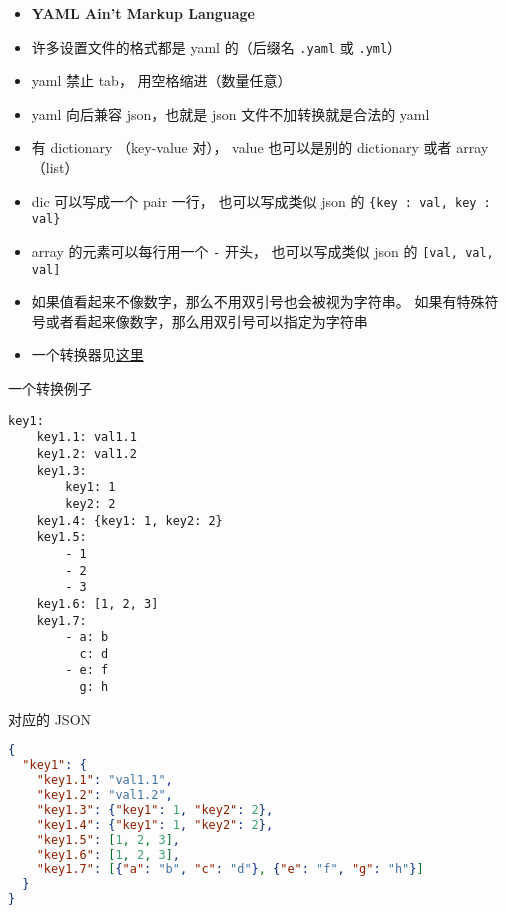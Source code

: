 
\begin{issues}
\issueDraft
\end{issues}


\begin{itemize}
\item \textbf{YAML Ain't Markup Language}
\item 许多设置文件的格式都是 yaml 的（后缀名 \verb`.yaml` 或 \verb`.yml`）
\item yaml 禁止 tab， 用空格缩进（数量任意）
\item yaml 向后兼容 json，也就是 json 文件不加转换就是合法的 yaml
\item 有 dictionary （key-value 对）， value 也可以是别的 dictionary 或者 array （list）
\item dic 可以写成一个 pair 一行， 也可以写成类似 json 的 \verb`{key : val, key : val}`
\item array 的元素可以每行用一个 \verb`-` 开头， 也可以写成类似 json 的 \verb`[val, val, val]`
\item 如果值看起来不像数字，那么不用双引号也会被视为字符串。 如果有特殊符号或者看起来像数字，那么用双引号可以指定为字符串
\item 一个转换器见\href{https://onlineyamltools.com/convert-yaml-to-json}{这里}
\end{itemize}

一个转换例子
\begin{lstlisting}[language=none]
key1:
    key1.1: val1.1
    key1.2: val1.2
    key1.3:
        key1: 1
        key2: 2
    key1.4: {key1: 1, key2: 2}
    key1.5:
        - 1
        - 2
        - 3
    key1.6: [1, 2, 3]
    key1.7:
        - a: b
          c: d
        - e: f
          g: h
\end{lstlisting}
对应的 JSON
\begin{lstlisting}[language=json]
{
  "key1": {
    "key1.1": "val1.1",
    "key1.2": "val1.2",
    "key1.3": {"key1": 1, "key2": 2},
    "key1.4": {"key1": 1, "key2": 2},
    "key1.5": [1, 2, 3],
    "key1.6": [1, 2, 3],
    "key1.7": [{"a": "b", "c": "d"}, {"e": "f", "g": "h"}]
  }
}
\end{lstlisting}
